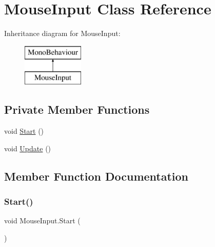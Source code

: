 \hypertarget{class_mouse_input}{}\section{Mouse\+Input Class Reference}
\label{class_mouse_input}
Inheritance diagram for Mouse\+Input\+:\begin{figure}[H]
\begin{center}
\leavevmode
\includegraphics[height=2.000000cm]{class_mouse_input}
\end{center}
\end{figure}
\subsection*{Private Member Functions}
\begin{DoxyCompactItemize}
\item 
void \hyperlink{class_mouse_input_a3474cace48c31c81738e8473501bd8e9}{Start} ()
\item 
void \hyperlink{class_mouse_input_a54020c3263b04ebec5052eb540d815fe}{Update} ()
\end{DoxyCompactItemize}


\subsection{Member Function Documentation}
\mbox{\label{class_mouse_input_a3474cace48c31c81738e8473501bd8e9}} 
\subsubsection{\texorpdfstring{Start()}{Start()}}
{\footnotesize\ttfamily void Mouse\+Input.\+Start (\begin{DoxyParamCaption}{ }\end{DoxyParamCaption})\hspace{0.3cm}{\ttfamily [private]}}

\mbox{\label{class_mouse_input_a54020c3263b04ebec5052eb540d815fe}} 
